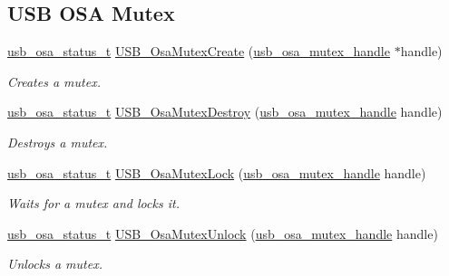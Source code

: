 \subsection*{U\-S\-B O\-S\-A Mutex}
\begin{DoxyCompactItemize}
\item 
\hyperlink{group__usb__os__abstraction_ga8de2fb7579de0a6621bbc1776519b0a9}{usb\-\_\-osa\-\_\-status\-\_\-t} \hyperlink{group__usb__os__abstraction_gaf36ecc5a6c3359a6587750b17800f49d}{U\-S\-B\-\_\-\-Osa\-Mutex\-Create} (\hyperlink{group__usb__os__abstraction_gad259d0dfe125b11cccaf93163ef915fd}{usb\-\_\-osa\-\_\-mutex\-\_\-handle} $\ast$handle)
\begin{DoxyCompactList}\small\item\em Creates a mutex. \end{DoxyCompactList}\item 
\hyperlink{group__usb__os__abstraction_ga8de2fb7579de0a6621bbc1776519b0a9}{usb\-\_\-osa\-\_\-status\-\_\-t} \hyperlink{group__usb__os__abstraction_ga68f890c3d76f212e6fa8cf787b918a5b}{U\-S\-B\-\_\-\-Osa\-Mutex\-Destroy} (\hyperlink{group__usb__os__abstraction_gad259d0dfe125b11cccaf93163ef915fd}{usb\-\_\-osa\-\_\-mutex\-\_\-handle} handle)
\begin{DoxyCompactList}\small\item\em Destroys a mutex. \end{DoxyCompactList}\item 
\hyperlink{group__usb__os__abstraction_ga8de2fb7579de0a6621bbc1776519b0a9}{usb\-\_\-osa\-\_\-status\-\_\-t} \hyperlink{group__usb__os__abstraction_ga1fed31c4b683c5f652b4e2e8b23c34fd}{U\-S\-B\-\_\-\-Osa\-Mutex\-Lock} (\hyperlink{group__usb__os__abstraction_gad259d0dfe125b11cccaf93163ef915fd}{usb\-\_\-osa\-\_\-mutex\-\_\-handle} handle)
\begin{DoxyCompactList}\small\item\em Waits for a mutex and locks it. \end{DoxyCompactList}\item 
\hyperlink{group__usb__os__abstraction_ga8de2fb7579de0a6621bbc1776519b0a9}{usb\-\_\-osa\-\_\-status\-\_\-t} \hyperlink{group__usb__os__abstraction_gaad3249273d566eae00e2cea81192315a}{U\-S\-B\-\_\-\-Osa\-Mutex\-Unlock} (\hyperlink{group__usb__os__abstraction_gad259d0dfe125b11cccaf93163ef915fd}{usb\-\_\-osa\-\_\-mutex\-\_\-handle} handle)
\begin{DoxyCompactList}\small\item\em Unlocks a mutex. \end{DoxyCompactList}\end{DoxyCompactItemize}
